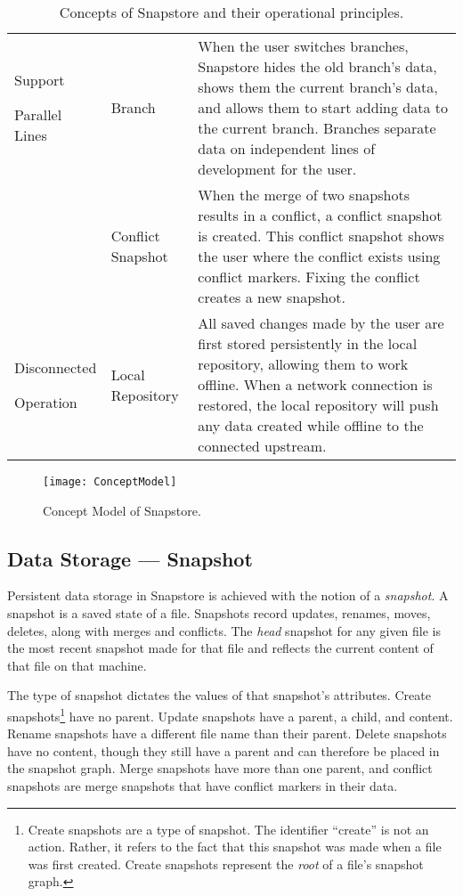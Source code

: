 \begin{table}
\begin{tabular}{ |p{2.5cm}||p{3.25cm}||p{10.5cm}|}
 \hline
 \parbox[t]{3cm}{Support \par Parallel Lines\strut} & Branch & When the user switches branches, Snapstore hides the old branch's data, shows them the current branch's data, and allows them to start adding data to the current branch. Branches separate data on independent lines of development for the user.\\[8pt]
  & Conflict Snapshot & When the merge of two snapshots results in a conflict, a conflict snapshot is created. This conflict snapshot shows the user where the conflict exists using conflict markers. Fixing the conflict creates a new snapshot.\\[8pt]
 \hline
 \parbox[t]{3cm}{Disconnected \par Operation\strut} & Local Repository & All saved changes made by the user are first stored persistently in the local repository, allowing them to work offline. When a network connection is restored, the local repository will push any data created while offline to the connected upstream.\\[8pt]
 \hline
\end{tabular}
\caption{Concepts of Snapstore and their operational principles.}
\end{table}


\begin{figure}
\texttt{[image: ConceptModel]}
\caption{Concept Model of Snapstore.}
\label{arm:fig1}
\end{figure}

\subsection{Data Storage --- Snapshot}

Persistent data storage in Snapstore is achieved with the notion of a \textit{snapshot}. A snapshot is a saved state of a file. Snapshots record updates, renames, moves, deletes, along with merges and conflicts. The \textit{head} snapshot for any given file is the most recent snapshot made for that file and reflects the current content of that file on that machine. 

The type of snapshot dictates the values of that snapshot's attributes. Create snapshots\footnote{Create snapshots are a type of snapshot. The identifier ``create'' is not an action. Rather, it refers to the fact that this snapshot was made when a file was first created. Create snapshots represent the \textit{root} of a file's snapshot graph.} have no parent. Update snapshots have a parent, a child, and content. Rename snapshots have a different file name than their parent. Delete snapshots have no content, though they still have a parent and can therefore be placed in the snapshot graph. Merge snapshots have more than one parent, and conflict snapshots are merge snapshots that have conflict markers in their data.

